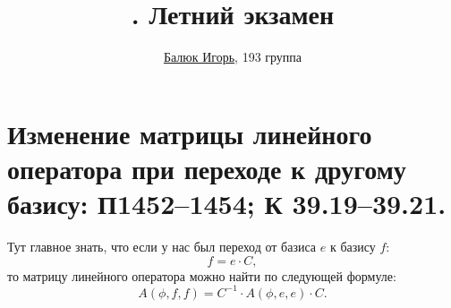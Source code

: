 \documentclass[a4paper]{article}
\title{\HugeЛАИГ. Летний экзамен}
\author{
    \href{https://teleg.run/lodthe}{Балюк Игорь}, 193 группа
}
\begin{document}
    \maketitle
    \tableofcontents
    
    \newpage
    \section{Изменение матрицы линейного оператора при переходе к другому базису: П1452--1454; К 39.19--39.21.}

        Тут главное знать, что если у нас был переход от базиса $e$ к базису $f$:
        \begin{equation*}
            f = e \cdot C,
        \end{equation*}
        то матрицу линейного оператора можно найти по следующей формуле:
        \begin{equation*}
            A(\phi, f, f) = C^{-1} \cdot A(\phi, e, e) \cdot C.
        \end{equation*}
\end{document}
